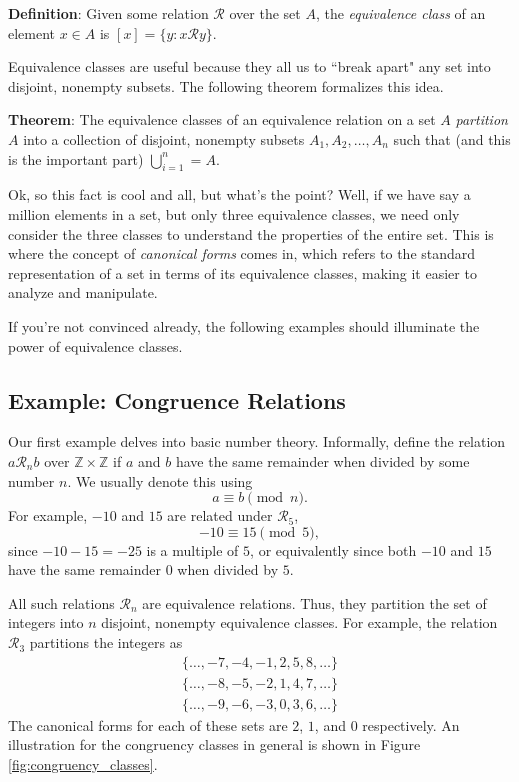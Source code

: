 \documentclass{article}
\begin{document}
    \vspace{2mm}
    \textbf{Definition}: Given some relation $\mathcal{R}$ over the set $A$, the \textit{equivalence class} of an element $x \in A$ is $[x] = \{y : x \mathcal{R} y\}$.

    \vspace{2mm}

    Equivalence classes are useful because they all us to ``break apart" any set into disjoint, nonempty subsets. The following theorem formalizes this idea.

    \begin{tcolorbox}
        \textbf{Theorem}: The equivalence classes of an equivalence relation on a set $A$ \textit{partition} $A$ into a collection of disjoint, nonempty subsets $A_{1}, A_{2}, \dots, A_{n}$ such that (and this is the important part) $\bigcup _{i = 1}^{n} = A$.
    \end{tcolorbox}
    
    \vspace{2mm}
    Ok, so this fact is cool and all, but what's the point? Well, if we have say a million elements in a set, but only three equivalence classes, we need only consider the three classes to understand the properties of the entire set. This is where the concept of \textit{canonical forms} comes in, which refers to the standard representation of a set in terms of its equivalence classes, making it easier to analyze and manipulate.
    
    \vspace{2mm}If you're not convinced already, the following examples should illuminate the power of equivalence classes.

    \subsection*{Example: Congruence Relations}
        Our first example delves into basic number theory. Informally, define the relation $a\mathcal{R}_{n}b$ over $\mathbb{Z} \times \mathbb{Z}$ if $a$ and $b$ have the same remainder when divided by some number $n$. We usually denote this using $$a \equiv b \pmod{n}.$$ For example, $-10$ and $15$ are related under $\mathcal{R}_{5}$, $$-10 \equiv 15 \pmod{5},$$ since $-10 - 15 = -25$ is a multiple of $5$, or equivalently since both $-10$ and $15$ have the same remainder $0$ when divided by $5$.
        
        \vspace{2mm}
        All such relations $\mathcal{R}_{n}$ are equivalence relations. Thus, they partition the set of integers into $n$ disjoint, nonempty equivalence classes. For example, the relation $\mathcal{R}_{3}$ partitions the integers as
        \begin{gather*}
            \{\dots, -7, -4, -1, 2, 5, 8, \dots\} \\
            \{\dots, -8, -5, -2, 1, 4, 7, \dots\} \\
            \{\dots, -9, -6, -3, 0, 3, 6, \dots\}
        \end{gather*}
        The canonical forms for each of these sets are $2$, $1$, and $0$ respectively. An illustration for the congruency classes in general is shown in Figure \ref*{fig:congruency_classes}.
\end{document}
